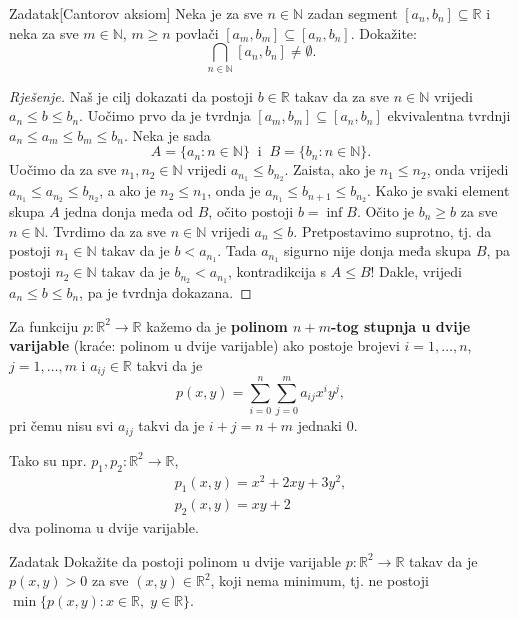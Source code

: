 \begin{exercise}{Zadatak}[Cantorov aksiom]
\label{Cantor}
Neka je za sve \(n\in \mathbb{N}\) zadan segment \([a_n, b_n]\subseteq \mathbb{R}\) i neka za sve \(m\in \mathbb{N}\), \(m\geq n\) povlači \([a_m, b_m]\subseteq [a_n, b_n]\). Dokažite:
\[\bigcap_{n\in \mathbb{N}}{[a_n, b_n]}\neq \emptyset.\]
\end{exercise}
\begin{proof}[Rješenje]
Naš je cilj dokazati da postoji \(b\in \mathbb{R}\) takav da za sve \(n\in \mathbb{N}\) vrijedi \(a_n\leq b\leq b_n\). Uočimo prvo da je tvrdnja \([a_m, b_m]\subseteq [a_n, b_n]\) ekvivalentna tvrdnji \(a_n\leq a_m\leq b_m\leq b_n\). Neka je sada \[A=\{a_n : n\in \mathbb{N}\}\;\;\text{i}\;\;B=\{b_n : n\in \mathbb{N}\}.\] Uočimo da za sve \(n_1, n_2\in \mathbb{N}\) vrijedi \(a_{n_1}\leq b_{n_2}\). Zaista, ako je \(n_1\leq n_2\), onda vrijedi \(a_{n_1}\leq a_{n_2}\leq b_{n_2}\), a ako je \(n_2\leq n_1\), onda je \(a_{n_1}\leq b_{n+1}\leq b_{n_2}\). Kako je svaki element skupa \(A\) jedna donja međa od \(B\), očito postoji \(b=\inf{B}\). Očito je \(b_n\geq b\) za sve \(n\in \mathbb{N}\). Tvrdimo da za sve \(n\in \mathbb{N}\) vrijedi \(a_n\leq b\). Pretpostavimo suprotno, tj. da postoji \(n_1\in \mathbb{N}\) takav da je \(b<a_{n_1}\). Tada \(a_{n_1}\) sigurno nije donja međa skupa \(B\), pa postoji \(n_2\in \mathbb{N}\) takav da je \(b_{n_2}<a_{n_1}\), kontradikcija s \(A\leq B\)! Dakle, vrijedi \(a_n\leq b\leq b_n\), pa je tvrdnja dokazana.
\end{proof}
\begin{definition}
Za funkciju \(p : \mathbb{R}^2\to \mathbb{R}\) kažemo da je \textbf{polinom \(n+m\)-tog stupnja u dvije varijable} (kraće: polinom u dvije varijable) ako postoje brojevi \(i=1, \dots, n\), \(j=1,\dots, m\) i \(a_{ij}\in \mathbb{R}\) takvi da je
\[p(x, y)=\sum_{i=0}^n{\sum_{j=0}^m{{a_{ij}}x^{i}y^j}},\]
pri čemu nisu svi \(a_{ij}\) takvi da je \(i+j=n+m\) jednaki \(0\).
\end{definition}
Tako su npr. \(p_1, p_2 : \mathbb{R}^2\to \mathbb{R}\),
\begin{gather*}
p_1(x, y)=x^2+2xy+3y^2,\\
p_2(x, y)=xy+2
\end{gather*}
dva polinoma u dvije varijable.
\begin{exercise}{Zadatak}
Dokažite da postoji polinom u dvije varijable \(p : \mathbb{R}^2\to \mathbb{R}\) takav da je \(p(x, y)>0\) za sve \((x, y)\in \mathbb{R}^2\), koji nema minimum, tj. ne postoji \(\min\{p(x, y) : x\in \mathbb{R},\; y\in \mathbb{R}\}.\)
\end{exercise}
